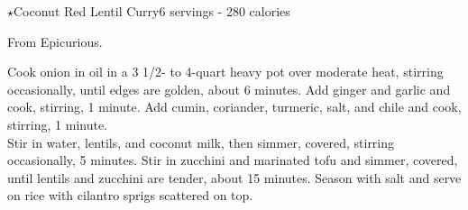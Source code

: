 \begin{recipe}{$\star$Coconut Red Lentil Curry}{6 servings - 280 calories}{}

\freeform From Epicurious.


Cook onion in oil in a 3 1/2- to 4-quart heavy pot over moderate heat, stirring occasionally, until edges are golden, about 6 minutes. Add ginger and garlic and cook, stirring, 1 minute. Add cumin, coriander, turmeric, salt, and chile and cook, stirring, 1 minute.\\

Stir in water, lentils, and coconut milk, then simmer, covered, stirring occasionally, 5 minutes. Stir in zucchini and marinated tofu and simmer, covered, until lentils and zucchini are tender, about 15 minutes. Season with salt and serve on rice with cilantro sprigs scattered on top.

\end{recipe}